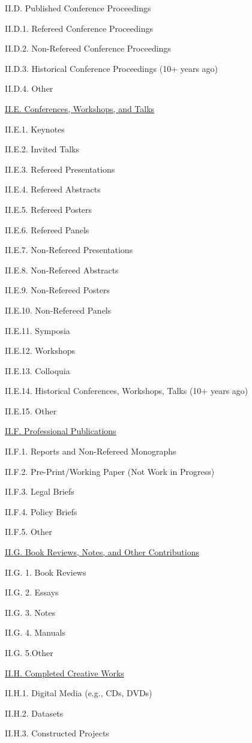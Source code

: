 \documentclass[11pt,letterpaper]{article}
\begin{document}
II.D. Published Conference Proceedings

II.D.1. Refereed Conference Proceedings

II.D.2. Non-Refereed Conference Proceedings

II.D.3. Historical Conference Proceedings (10+ years ago)

II.D.4. Other


\underline{II.E. Conferences, Workshops, and Talks}

II.E.1. Keynotes

II.E.2. Invited Talks

II.E.3. Refereed Presentations

II.E.4. Refereed Abstracts

II.E.5. Refereed Posters

II.E.6. Refereed Panels

II.E.7. Non-Refereed Presentations

II.E.8. Non-Refereed Abstracts

II.E.9. Non-Refereed Posters

II.E.10. Non-Refereed Panels

II.E.11. Symposia

II.E.12. Workshops

II.E.13. Colloquia

II.E.14. Historical Conferences, Workshops, Talks (10+ years ago)

II.E.15. Other


\underline{II.F. Professional Publications}

II.F.1. Reports and Non-Refereed Monographs

II.F.2. Pre-Print/Working Paper (Not Work in Progress)

II.F.3. Legal Briefs

II.F.4. Policy Briefs

II.F.5. Other


\underline{II.G. Book Reviews, Notes, and Other Contributions}

II.G. 1. Book Reviews

II.G. 2. Essays

II.G. 3. Notes

II.G. 4. Manuals

II.G. 5.Other


\underline{II.H. Completed Creative Works}

II.H.1. Digital Media (e.g., CDs, DVDs)

II.H.2. Datasets

II.H.3. Constructed Projects
\end{document}
